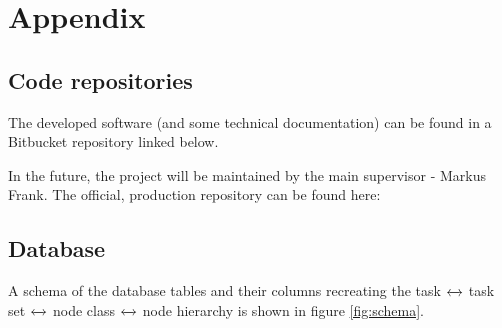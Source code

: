 

\newpage
\section{Appendix}

\subsection{Code repositories}
\hspace{0.6cm}

The developed software (and some technical documentation) can be found in a Bitbucket repository linked below.
\newline

\noindent{}

\vspace{0.6cm}

\noindent
In the future, the project will be maintained by the main supervisor - Markus Frank. The official, production repository can be found here:
\newline

\noindent{}
\vspace{0.6cm}



\subsection{Database}
\hspace{0.6cm}

A schema of the database tables and their columns recreating the task $\xleftrightarrow{}$ task set $\xleftrightarrow{}$ node class $\xleftrightarrow{}$ node hierarchy is shown in figure \ref{fig:schema}.
\newline

